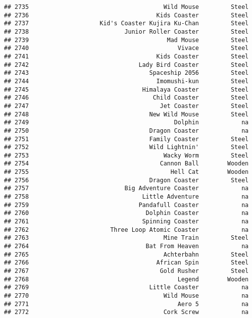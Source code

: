 \documentclass[
]{article}
\begin{document}
\begin{verbatim}
## 2735                                      Wild Mouse         Steel
## 2736                                    Kids Coaster         Steel
## 2737                    Kid's Coaster Kujira Ku-Chan         Steel
## 2738                           Junior Roller Coaster         Steel
## 2739                                       Mad Mouse         Steel
## 2740                                          Vivace         Steel
## 2741                                    Kids Coaster         Steel
## 2742                               Lady Bird Coaster         Steel
## 2743                                  Spaceship 2056         Steel
## 2744                                    Imomushi-kun         Steel
## 2745                                Himalaya Coaster         Steel
## 2746                                   Child Coaster         Steel
## 2747                                     Jet Coaster         Steel
## 2748                                  New Wild Mouse         Steel
## 2749                                         Dolphin            na
## 2750                                  Dragon Coaster            na
## 2751                                  Family Coaster         Steel
## 2752                                  Wild Lightnin'         Steel
## 2753                                      Wacky Worm         Steel
## 2754                                     Cannon Ball        Wooden
## 2755                                        Hell Cat        Wooden
## 2756                                  Dragon Coaster         Steel
## 2757                           Big Adventure Coaster            na
## 2758                                Little Adventure            na
## 2759                               Pandafull Coaster            na
## 2760                                 Dolphin Coaster            na
## 2761                                Spinning Coaster            na
## 2762                       Three Loop Atomic Coaster            na
## 2763                                      Mine Train         Steel
## 2764                                 Bat From Heaven            na
## 2765                                      Achterbahn         Steel
## 2766                                    African Spin         Steel
## 2767                                     Gold Rusher         Steel
## 2768                                          Legend        Wooden
## 2769                                  Little Coaster            na
## 2770                                      Wild Mouse            na
## 2771                                          Aero 5            na
## 2772                                      Cork Screw            na

\end{verbatim}
\end{document}
